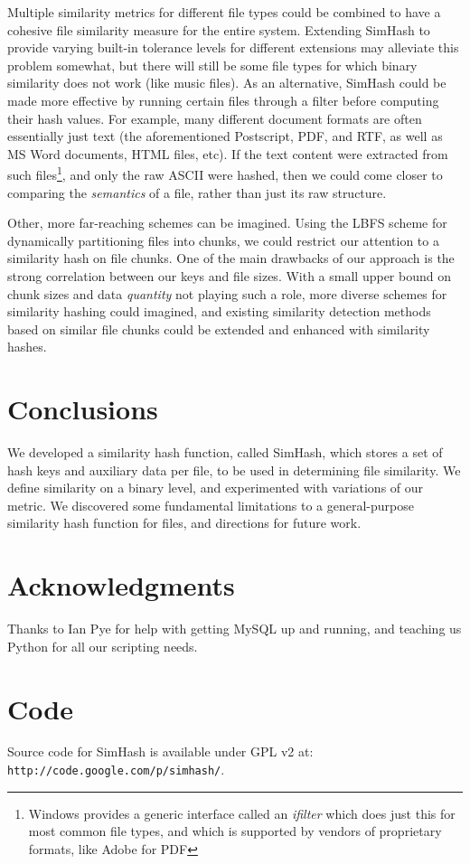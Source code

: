 \documentclass[10pt, twocolumn]{article}
\begin{document}
Multiple similarity metrics for different file types could be combined to have a cohesive file similarity measure for the entire system.  Extending SimHash to provide varying built-in tolerance levels for different extensions may alleviate this problem somewhat, but there will still be some file types for which binary similarity does not work (like music files).  As an alternative, SimHash could be made more effective by running certain files through a filter before computing their hash values.  For example, many different document formats are often essentially just text (the aforementioned Postscript, PDF, and RTF, as well as MS Word documents, HTML files, etc).  If the text content were extracted from such files\footnote{Windows provides a generic interface called an {\it ifilter} which does just this for most common file types, and which is supported by vendors of proprietary formats, like Adobe for PDF}, and only the raw ASCII were hashed, then we could come closer to comparing the {\it semantics} of a file, rather than just its raw structure.

Other, more far-reaching schemes can be imagined.  Using the LBFS \cite{lbfs} scheme for dynamically partitioning files into chunks, we could restrict our attention to a similarity hash on file chunks.  One of the main drawbacks of our approach is the strong correlation between our keys and file sizes.  With a small upper bound on chunk sizes and data {\it quantity} not playing such a role, more diverse schemes for similarity hashing could imagined, and existing similarity detection methods based on similar file chunks could be extended and enhanced with similarity hashes. 



\section{Conclusions}

We developed a similarity hash function, called SimHash, which stores a set of hash keys and auxiliary data per file, to be used in determining file similarity. We define similarity on a binary level, and experimented with variations of our metric. We discovered some fundamental limitations to a general-purpose similarity hash function for files, and directions for future work.

\section{Acknowledgments}
Thanks to Ian Pye for help with getting MySQL up and running, and teaching us Python for all our scripting needs.

\section{Code}

Source code for SimHash is available under GPL v2 at: { \tt http://code.google.com/p/simhash/}.






\end{document}
